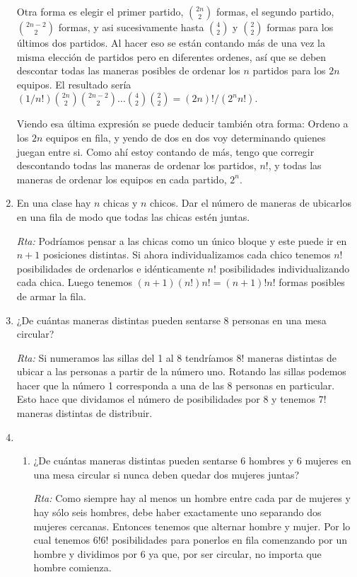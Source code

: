 \documentclass[a4paper,12pt,twoside,spanish,reqno]{amsbook}
\numberwithin{equation}{section}
\begin{document}
\begin{enumerate}
 Otra forma es elegir el primer partido, $\binom{2n}{2}$ formas, el segundo partido,$\binom{2n-2}{2}$ formas, y asi sucesivamente hasta $\binom{4}{2}$ y $\binom{2}{2}$ formas para los últimos dos partidos. Al hacer eso se están contando más de una vez la misma elección de partidos pero en diferentes ordenes, así que se deben descontar todas las maneras posibles de ordenar los $n$ partidos para los $2n$ equipos. El resultado sería $(1 / n!) \binom{2n}{2}\binom{2n-2}{2}\dots \binom{4}{2}\binom{2}{2}= (2n)! / ( 2^n n!)$.

Viendo esa última expresión se puede deducir también otra forma: Ordeno a los $2n$ equipos en fila, y yendo de dos en dos voy determinando quienes juegan entre si. Como ahí estoy contando de más, tengo que corregir descontando todas las maneras de ordenar los partidos, $n!$, y todas las maneras de ordenar los equipos en cada partido, $2^n$.

\medskip

\item En una clase hay $n$ chicas y $n$ chicos. Dar el número de maneras de ubicarlos en una fila de modo que todas las chicas estén juntas.

\noindent\textit{Rta:} Podríamos pensar a las chicas como un único bloque y este puede ir en $n+1$ posiciones distintas. Si ahora individualizamos cada chico tenemos $n!$ posibilidades de ordenarlos e idénticamente $n!$ posibilidades individualizando cada chica. Luego tenemos $(n+1)(n!)n!=(n+1)!n!$ formas posibles de armar la fila.

\medskip

\item ¿De cuántas maneras distintas pueden sentarse 8 personas en una mesa circular?

\noindent\textit{Rta:} Si numeramos las sillas del 1 al 8 tendríamos $8!$ maneras distintas de ubicar a las personas a partir de la número uno. Rotando las sillas podemos hacer que la número 1 corresponda a una de las 8 personas en particular. Esto hace que dividamos el número de posibilidades por 8 y tenemos $7!$ maneras distintas de distribuir.

\medskip

\item 
\begin{enumerate}
\item 
¿De cuántas maneras distintas pueden sentarse 6 hombres y 6 mujeres en una
mesa circular si nunca deben quedar dos mujeres juntas?

\noindent\textit{Rta:} Como siempre hay al menos un hombre entre cada par de mujeres y hay sólo seis hombres, debe haber exactamente uno separando dos mujeres cercanas. Entonces tenemos que alternar hombre y mujer. Por lo cual tenemos $6!6!$ posibilidades para ponerlos en fila comenzando por un hombre y dividimos por 6 ya que, por ser circular, no importa que hombre comienza. 


\end{enumerate}
\end{enumerate}
\end{document}
